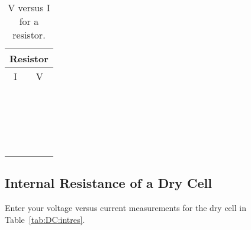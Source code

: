 \begin{table}[htb]
\begin{center}
\begin{tabular}{|c|c|}
\hline
\multicolumn{2}{|c|}{Resistor}\\
\hline
I & V \\
\hline
\hspace*{5cm} & \hspace*{5cm} \\
& \\
\hline
& \\
& \\
\hline
& \\
& \\
\hline
& \\
& \\
\hline
& \\
& \\
\hline
& \\
& \\
\hline
& \\
& \\
\hline
& \\
& \\
\hline
& \\
& \\
\hline
& \\
& \\
\hline
\end{tabular}
\end{center}
\caption{V versus I for a resistor.}
\label{tab:DC:resisplot}
\end{table}


\subsection{Internal Resistance of a Dry Cell}
\noindent
Enter your voltage versus current measurements for the dry cell in
Table~\ref{tab:DC:intres}.

